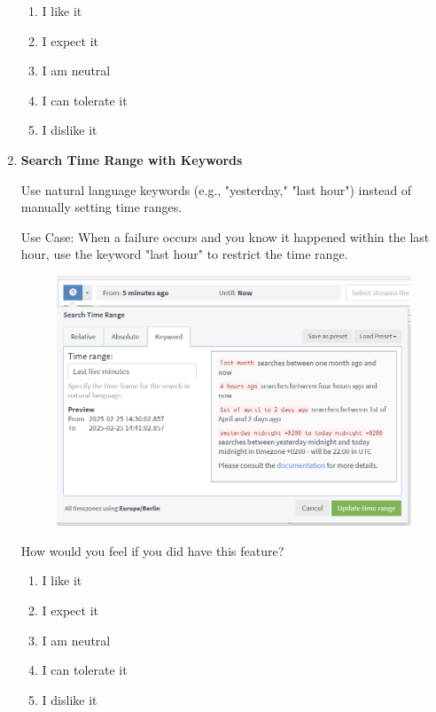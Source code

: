 \documentclass[../main.tex]{subfiles}
\begin{document}
\begin{enumerate}
    \begin{enumerate}
        \item I like it
        \item I expect it
        \item  I am neutral
        \item I can tolerate it
        \item I dislike it
    \end{enumerate}

    \clearpage
    \item \textbf{Search Time Range with Keywords}
    
    Use natural language keywords (e.g., "yesterday," "last hour") instead of manually setting time ranges. 
    
    Use Case: When a failure occurs and you know it happened within the last hour, use the keyword "last hour" to restrict the time range.

    \begin{figure}[H]
        \centering
        \includegraphics[scale=0.9]{img/10-appendix/timerange_keywords.png}
        \label{fig:timerange_keywords}
    \end{figure}

    How would you feel if you did have this feature?
    
    \begin{enumerate}
        \item I like it
        \item I expect it
        \item  I am neutral
        \item I can tolerate it
        \item I dislike it
    \end{enumerate}


\end{enumerate}
\end{document}
